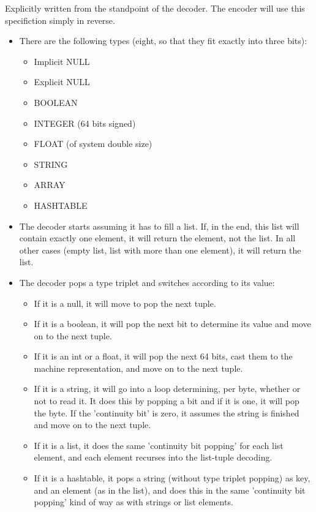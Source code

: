 Explicitly written from the standpoint of the decoder.
The encoder will use this specifiction simply in reverse.

\begin{itemize}
\item There are the following types (eight, so that they fit exactly
      into three bits):
  \begin{itemize}
  \item Implicit NULL
  \item Explicit NULL
  \item BOOLEAN
  \item INTEGER (64 bits signed)
  \item FLOAT (of system double size)
  \item STRING
  \item ARRAY
  \item HASHTABLE
  \end{itemize}

\item The decoder starts assuming it has to fill a list.
  If, in the end, this list will contain exactly one element, it will
  return the element, not the list. In all other cases (empty list,
  list with more than one element), it will return the list.

\item The decoder pops a type triplet and switches according to its value:
  \begin{itemize}
  \item If it is a null, it will move to pop the next tuple.
  \item If it is a boolean, it will pop the next bit to determine its value
        and move on to the next tuple.
  \item If it is an int or a float, it will pop the next 64 bits,
        cast them to the machine representation, and move on to the next tuple.
  \item If it is a string, it will go into a loop determining, per byte,
        whether or not to read it. It does this by popping a bit and if
        it is one, it will pop the byte. If the 'continuity bit' is zero,
        it assumes the string is finished and move on to the next tuple.
  \item If it is a list, it does the same 'continuity bit popping' for
        each list element, and each element recurses into the list-tuple
        decoding.
  \item If it is a hashtable, it pops a string (without type triplet popping)
        as key, and an element (as in the list), and does this in the same
        'continuity bit popping' kind of way as with strings or list elements.
  \end{itemize}


\end{itemize}
